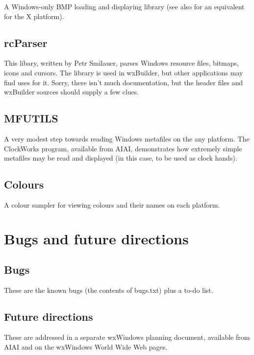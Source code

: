A Windows-only BMP loading and displaying library (see also\rtfsp
{} for an equivalent for the X platform).

\section{rcParser}\label{rcparser}

This libary, written by Petr Smilauer, parses Windows resource files,
bitmaps, icons and cursors. The library is used in wxBuilder, but other
applications may find uses for it. Sorry, there isn't much documentation,
but the header files and wxBuilder sources should supply a few clues.

\section{MFUTILS}\label{mfutils}

A very modest step towards reading Windows metafiles on the
any platform. The ClockWorks program, available from AIAI, demonstrates
how extremely simple metafiles may be read and displayed (in this
case, to be used as clock hands).

\section{Colours}\label{coloursampler}

A colour sampler for viewing colours and their names on each
platform.

\chapter{Bugs and future directions}\label{bugs}
%
\setfooter{\thepage}{}{}{}{}{\thepage}%

\section{Bugs}

These are the known bugs (the contents of bugs.txt) plus a to-do list.


%
\section{Future directions}

These are addressed in a separate wxWindows planning document,
available from AIAI and on the wxWindows World Wide Web pages.

